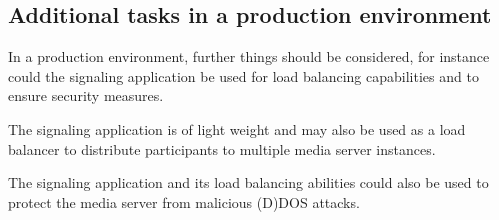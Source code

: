\documentclass[../../../thesis.tex]{subfiles}
\begin{document}
\subsection{Additional tasks in a production environment}
In a production environment, further things should be considered, for instance could the signaling application be used for load balancing capabilities and to ensure security measures.\par
The signaling application is of light weight and may also be used as a load balancer to distribute participants to multiple media server instances.\par
The signaling application and its load balancing abilities could also be used to protect the media server from malicious (D)DOS attacks.
\end{document}
